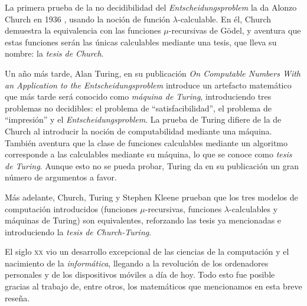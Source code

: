 La primera prueba de la no decidibilidad del \emph{Entscheidungsproblem} la da Alonzo Church en 1936 \cite{Church1936}, usando la noción de función $\lambda$-calculable. En él, Church demuestra la equivalencia con las funciones $\mu$-recursivas de Gödel, y aventura que estas funciones serán las únicas calculables mediante una tesis, que lleva su nombre: la \emph{tesis de Church}.

Un año más tarde, Alan Turing, en su publicación \emph{On Computable Numbers With an Application to the Entscheidungsproblem} \cite{Turing1937} introduce un artefacto matemático que más tarde será conocido como \emph{máquina de Turing}, introduciendo tres problemas no decidibles: el problema de ``satisfacibilidad'', el problema de ``impresión'' y el \emph{Entscheidungsproblem}. La prueba de Turing difiere de la de Church al introducir la noción de computabilidad mediante una máquina. También aventura que la clase de funciones calculables mediante un algoritmo corresponde a las calculables mediante su máquina, lo que se conoce como \emph{tesis de Turing}. Aunque esto no se pueda probar, Turing da en su publicación un gran número de argumentos a favor.

Más adelante, Church, Turing y Stephen Kleene \cite{Kleene1971} prueban que los tres modelos de computación introducidos (funciones $\mu$-recursivas, funciones $\lambda$-calculables y máquinas de Turing) son equivalentes, reforzando las tesis ya mencionadas e introduciendo la \emph{tesis de Church-Turing}.

El siglo \textsc{xx} vio un desarrollo excepcional de las ciencias de la computación y el nacimiento de la \emph{informática}, llegando a la revolución de los ordenadores personales y de los dispositivos móviles a día de hoy. Todo esto fue posible gracias al trabajo de, entre otros, los matemáticos que mencionamos en esta breve reseña.

\endinput
